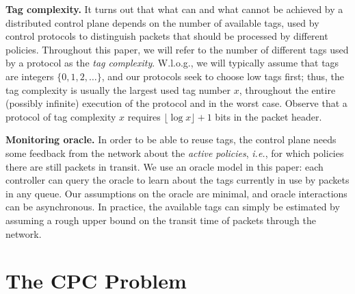 \documentclass[11pt,pdftex,letter]{article}
\newcommand{\ie}{{\it i.e.}}
\newcommand{\mcnote}[1]{\textcolor{heraldBlue}{\small \bf [MC: #1]}}
\newcommand{\mcnote}[1]{}
\begin{document}
\vspace{1mm}\noindent\textbf{Tag complexity.} It turns out that what can and what cannot be achieved
by a distributed control plane depends on the number of available tags,
used by control protocols to distinguish packets that should be processed by different policies.
Throughout this
paper, we will refer to the number of different tags used by a protocol as the
\emph{tag complexity}. W.l.o.g., we will typically assume that tags are integers $\{0,1,2,\ldots\}$,
and our protocols seek to choose low tags first; thus, the tag complexity is usually the largest
used tag number $x$, throughout the entire (possibly infinite) execution of the protocol and in the
worst case. Observe that a protocol of tag complexity $x$ requires $\lfloor\log{x}\rfloor+1$ bits
in the packet header.


\vspace{1mm}\noindent\textbf{Monitoring oracle.} In order to be able to reuse tags, the control plane needs some feedback
from the network about the \emph{active policies}, \ie, for which policies there are still packets in transit.
We use an oracle model in this paper: each controller can query the oracle to learn about the tags currently
in use by packets in any queue. Our assumptions on the oracle are minimal, and oracle interactions can be asynchronous.
In practice, the available tags can simply be estimated by assuming a rough upper bound on the transit time of
packets through the network.


\section{The CPC Problem}\label{sec:problem}
\end{document}
